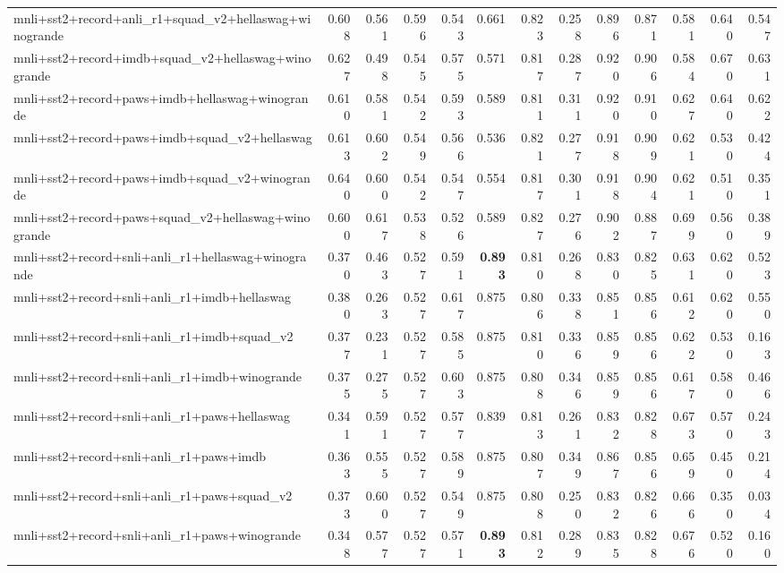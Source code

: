 \begin{table}[t]
\begin{tabular}{lrrrrrrrrrrrr}
    mnli+sst2+record+anli\_r1+squad\_v2+hellaswag+winogrande & 0.608 & 0.561 & 0.596 & 0.543 & 0.661 & 0.823 & 0.258 & 0.896 & 0.871 & 0.581 & 0.640 & 0.547 \\
    mnli+sst2+record+imdb+squad\_v2+hellaswag+winogrande & 0.627 & 0.498 & 0.545 & 0.575 & 0.571 & 0.817 & 0.287 & 0.920 & 0.906 & 0.584 & 0.670 & 0.631 \\
    mnli+sst2+record+paws+imdb+hellaswag+winogrande & 0.610 & 0.581 & 0.542 & 0.593 & 0.589 & 0.811 & 0.311 & 0.920 & 0.910 & 0.627 & 0.640 & 0.622 \\
    mnli+sst2+record+paws+imdb+squad\_v2+hellaswag & 0.613 & 0.602 & 0.549 & 0.566 & 0.536 & 0.821 & 0.277 & 0.918 & 0.909 & 0.621 & 0.530 & 0.424 \\
    mnli+sst2+record+paws+imdb+squad\_v2+winogrande & 0.640 & 0.600 & 0.542 & 0.547 & 0.554 & 0.817 & 0.301 & 0.918 & 0.904 & 0.621 & 0.510 & 0.351 \\
    mnli+sst2+record+paws+squad\_v2+hellaswag+winogrande & 0.600 & 0.617 & 0.538 & 0.526 & 0.589 & 0.827 & 0.276 & 0.902 & 0.887 & 0.699 & 0.560 & 0.389 \\
    mnli+sst2+record+snli+anli\_r1+hellaswag+winogrande & 0.370 & 0.463 & 0.527 & 0.591 & \textbf{0.893} & 0.810 & 0.268 & 0.830 & 0.825 & 0.631 & 0.620 & 0.523 \\
    mnli+sst2+record+snli+anli\_r1+imdb+hellaswag & 0.380 & 0.263 & 0.527 & 0.617 & 0.875 & 0.806 & 0.338 & 0.851 & 0.856 & 0.612 & 0.620 & 0.550 \\
    mnli+sst2+record+snli+anli\_r1+imdb+squad\_v2 & 0.377 & 0.231 & 0.527 & 0.585 & 0.875 & 0.810 & 0.336 & 0.859 & 0.856 & 0.622 & 0.530 & 0.163 \\
    mnli+sst2+record+snli+anli\_r1+imdb+winogrande & 0.375 & 0.275 & 0.527 & 0.603 & 0.875 & 0.808 & 0.346 & 0.859 & 0.856 & 0.617 & 0.580 & 0.466 \\
    mnli+sst2+record+snli+anli\_r1+paws+hellaswag & 0.341 & 0.591 & 0.527 & 0.577 & 0.839 & 0.813 & 0.261 & 0.832 & 0.828 & 0.673 & 0.570 & 0.243 \\
    mnli+sst2+record+snli+anli\_r1+paws+imdb & 0.363 & 0.555 & 0.527 & 0.589 & 0.875 & 0.807 & 0.349 & 0.867 & 0.856 & 0.659 & 0.450 & 0.214 \\
    mnli+sst2+record+snli+anli\_r1+paws+squad\_v2 & 0.373 & 0.600 & 0.527 & 0.549 & 0.875 & 0.808 & 0.250 & 0.832 & 0.826 & 0.666 & 0.350 & 0.034 \\
    mnli+sst2+record+snli+anli\_r1+paws+winogrande & 0.348 & 0.577 & 0.527 & 0.571 & \textbf{0.893} & 0.812 & 0.289 & 0.835 & 0.828 & 0.676 & 0.520 & 0.160 \\

\end{tabular}
\end{table}

